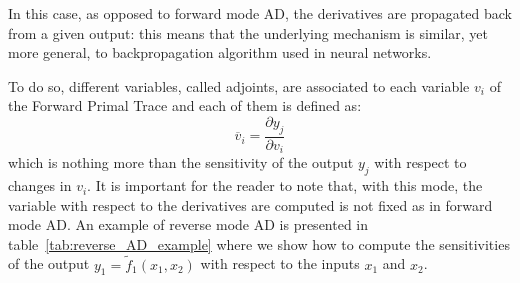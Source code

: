 In this case, as opposed to forward mode AD, the derivatives are propagated back from a given output: this means that the underlying mechanism is similar, yet more general, to backpropagation algorithm used in neural networks.

To do so, different variables, called adjoints, are associated to each variable $v_i$ of the Forward Primal Trace and each of them is defined as:
\[
\overline{v}_i = \frac{\partial y_j}{\partial v_i}
\]
which is nothing more than the sensitivity of the output $y_j$ with respect to changes in $v_i$. It is important for the reader to note that, with this mode, the variable with respect to the derivatives are computed is not fixed as in forward mode AD. An example of reverse mode AD is presented in table~\ref{tab:reverse_AD_example} where we show how to compute the sensitivities of the output $y_1 = \tilde{f}_1(x_1, x_2)$ with respect to the inputs $x_1$ and $x_2$.

